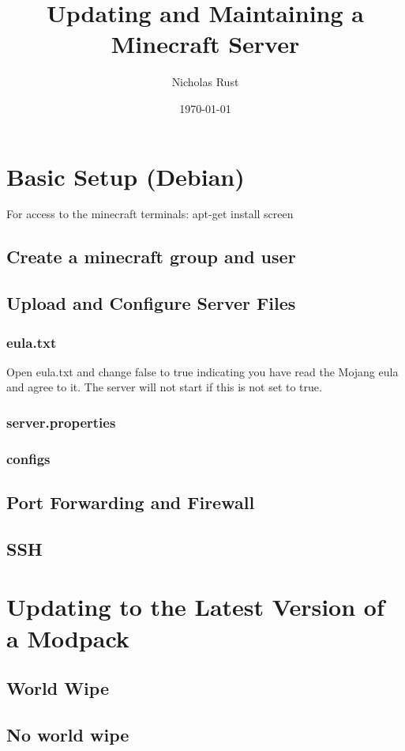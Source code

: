 \documentclass{article}
\title{Updating and Maintaining a Minecraft Server}
\author{Nicholas Rust}
\date{\today}
\begin{document}
\maketitle

\tableofcontents

\pagebreak

\section{Basic Setup (Debian)}
For access to the minecraft terminals:
apt-get install screen 

\subsection{Create a minecraft group and user}

\subsection{Upload and Configure Server Files}

\subsubsection{eula.txt}
Open eula.txt and change false to true indicating you have read the Mojang eula and agree to it. The server will not start if this is not set to true.

\subsubsection{server.properties}

\subsubsection{configs}

\subsection{Port Forwarding and Firewall}

\subsection{SSH}

\section{Updating to the Latest Version of a Modpack}

\subsection{World Wipe}

\subsection{No world wipe}
\end{document}
